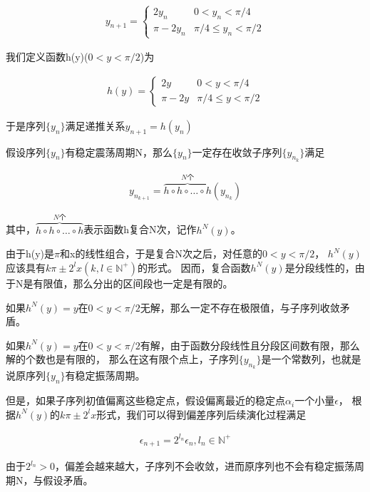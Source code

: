 \documentclass[10pt, a4paper]{article}
\begin{document}
    \begin{align}
        y_{n+1}=
        \begin{cases}
            2y_n & 0<y_n<\pi/4\\
            \pi-2y_n &\pi/4\le y_n<\pi/2
        \end{cases}
    \end{align}

    我们定义函数h(y)($0<y<\pi/2$)为

    \begin{align}
        h(y)=
        \begin{cases}
            2y & 0<y<\pi/4\\
            \pi-2y &\pi/4\le y<\pi/2
        \end{cases}
    \end{align}

    于是序列$\{y_n\}$满足递推关系$y_{n+1}=h(y_n)$

    假设序列$\{y_n\}$有稳定震荡周期N，那么$\{y_n\}$一定存在收敛子序列$\{y_{n_k}\}$满足

    \begin{align}
        y_{n_{k+1}}=\overbrace {h\circ h\circ \dots \circ h}^{N\text{个}}(y_{n_k})
    \end{align}

    其中，$\overbrace {h\circ h\circ \dots \circ h}^{N\text{个}}$表示函数h复合N次，记作$h^N(y)$。

    由于h(y)是$\pi$和x的线性组合，于是复合N次之后，对任意的$0<y<\pi/2$，
    $h^N(y)$应该具有$k\pi\pm2^l x(k,l\in\mathbb{N^+})$的形式。
    因而，复合函数$h^N(y)$是分段线性的，由于N是有限值，那么分出的区间段也一定是有限的。

    如果$h^N(y)=y$在$0<y<\pi/2$无解，那么一定不存在极限值，与子序列收敛矛盾。

    如果$h^N(y)=y$在$0<y<\pi/2$有解，由于函数分段线性且分段区间数有限，那么解的个数也是有限的，
    那么在这有限个点上，子序列$\{y_{n_k}\}$是一个常数列，也就是说原序列$\{y_n\}$有稳定振荡周期。

    但是，如果子序列初值偏离这些稳定点，假设偏离最近的稳定点$\alpha_i$一个小量$\epsilon$，
    根据$h^N(y)$的$k\pi\pm2^l x$形式，我们可以得到偏差序列后续演化过程满足

    \begin{align}
        \epsilon_{n+1}=2^{l_n}\epsilon_n,l_n\in\mathbb{N^+}
    \end{align}

    由于$2^{l_n}>0$，偏差会越来越大，子序列不会收敛，进而原序列也不会有稳定振荡周期N，与假设矛盾。
\end{document}

